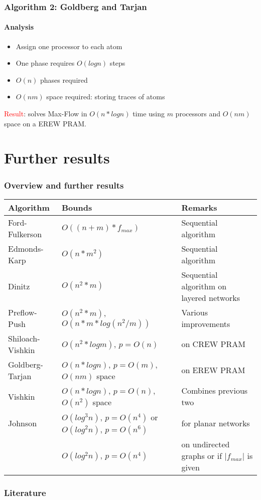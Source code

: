 \documentclass{beamer}
\begin{document}
\begin{frame}
\frametitle{Algorithm 2: Goldberg and Tarjan}
\framesubtitle{Analysis}
\begin{itemize}
	\item Assign one processor to each atom
	\item One phase requires $O(log n)$ steps
	\item $O(n)$ phases required
	\item $O(nm)$ space required: storing traces of atoms
\end{itemize}
\textcolor{red}{Result}: solves Max-Flow in $O(n*log n)$ time using $m$ processors  and $O(nm)$ space on a EREW PRAM.
\end{frame}


\section{Further results}
\begin{frame}
\frametitle{Overview and further results}
\fontsize{8.5pt}{8}\selectfont
\begin{table}
\begin{tabularx}{\textwidth}{|X|X|X|}
\hline
Algorithm & Bounds & Remarks \\
\hline
\rowcolor{c1} Ford-Fulkerson\cite{ahuja93} & $O((n+m) * f_{max})$ & Sequential algorithm \\
\rowcolor{c2} Edmonds-Karp\cite{ahuja93} & $O(n*m^2)$ & Sequential algorithm  \\
\rowcolor{c1} Dinitz\cite{dinitz70}& $O(n^2*m)$ & Sequential algorithm on layered networks\\
\rowcolor{c2} Preflow-Push\cite{ahuja93} & $O(n^2*m)$, $O(n*m*log(n^2/m))$ & Various improvements\\
\rowcolor{c1} Shiloach-Vishkin\cite{yossi81} & $O(n^2*log m)$, $p=O(n)$ & on CREW PRAM\\
\rowcolor{c2} Goldberg-Tarjan\cite{goldberg89} & $O(n*log n)$, $p=O(m)$, $O(nm)$ space & on EREW PRAM \\
\rowcolor{c1} Vishkin\cite{vishkin92} & $O(n*log n)$, $p=O(n)$, $O(n^2)$ space & Combines previous two\\
\rowcolor{c2} Johnson\cite{johnson87} & $O(log^{3} n)$, $p=O(n^{4})$ or $O(log^{2} n)$, $p=O(n^{6})$ &
for planar networks\\
\rowcolor{c1} & $	O(log^{2} n)$, $p=O(n^{4})$ & on undirected graphs or if  $\lvert f_{max} \rvert$ is given\\
\hline
\end{tabularx}
\end{table}
\end{frame}

\begin{frame}[allowframebreaks]
\frametitle<presentation>{Literature}    
\printbibliography
\end{frame} 	 
\end{document}
